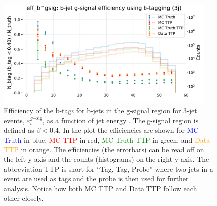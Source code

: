 \documentclass[a4paper, twoside, nobib]{tufte-book}
\newcommand{\code}[1]{\colorbox{light-gray}{\texttt{\detokenize{#1}}}}
\newcommand{\q}[1]{``#1''}
\begin{document}
\begin{figure}
  \includegraphics[width=0.95\textwidth, trim=0 0 0 40, clip]{figures/quarks/eff_b_gsig-down_sample=1.00-ML_vars=vertex-selection=b-ejet_min=4-n_iter_RS_lgb=99-n_iter_RS_xgb=9-cdot_cut=0.90-version=19.pdf}
  \caption[b-Tagging Efficiency $\varepsilon_b^{g\mathrm{-sig}}$ as a function of jet energy]
          {Efficiency of the b-tags for b-jets in the g-signal region for 3-jet events, $\varepsilon_b^{g\mathrm{-sig}}$, as a function of jet energy \code{Ejet}. The g-signal region is defined as $\beta < 0.4$. In the plot the efficiencies are shown for \textcolor{blue}{MC Truth} in blue, \textcolor{red}{MC TTP} in red, \textcolor{green}{MC Truth TTP} in green, and \textcolor{orange}{Data TTP} in orange. The efficiencies (the errorbars) can be read off on the left y-axis and the counts (histograms) on the right y-axis. The abbreviation TTP is short for \q{Tag, Tag, Probe} where two jets in a event are used as tags and the probe is then used for further analysis. Notice how both MC TTP and Data TTP follow each other closely.  
          } 
  \label{fig:q:effiency_btag_bjet_gsig}
\end{figure}
\end{document}
